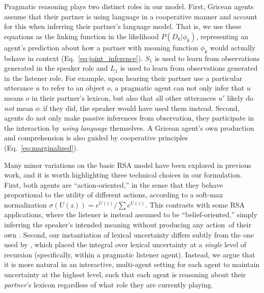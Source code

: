 Pragmatic reasoning plays two distinct roles in our model.
First, Gricean agents assume that their partner is using language in a cooperative manner and account for this when inferring their partner's language model.
That is, we use these equations as the linking function in the likelihood $P(D_k | \phi_k)$, representing an agent's prediction about how a partner with meaning function $\phi_k$ would actually behave in context (Eq.~\ref{eq:joint_inference}). 
$S_1$ is used to learn from observations generated in the speaker role and $L_1$ is used to learn from observations generated in the listener role.
For example, upon hearing their partner use a particular utterance $u$ to refer to an object $o$, a pragmatic agent can not only infer that $u$ means $o$ in their partner's lexicon, but also that all other utterances $u'$ likely do \emph{not} mean $o$: if they did, the speaker would have used them instead.
Second, agents do not only make passive inferences from observation, they participate in the interaction by \emph{using language} themselves.
A Gricean agent's own production and comprehension is also guided by cooperative principles (Eq.~\ref{eq:marginalized}).

Many minor variations on the basic RSA model have been explored in previous work, and it is worth highlighting three technical choices in our formulation.
First, both agents are ``action-oriented,'' in the sense that they behave proportional to the utility of different actions, according to a soft-max normalization $\sigma(U(z)) = e^{U(z)}/\sum e^{U(z)}$.
This contrasts with some RSA applications, where the listener is instead assumed to be ``belief-oriented,'' simply inferring the speaker's intended meaning without producing any action of their own \cite{qing2015variations}.
Second, our instantiation of lexical uncertainty differs subtly from the one used by , which placed the integral over lexical uncertainty at a \emph{single} level of recursion (specifically, within a pragmatic listener agent).
Instead, we argue that it is more natural in an interactive, multi-agent setting for each agent to maintain uncertainty at the highest level, such that each agent is reasoning about their \emph{partner}'s lexicon regardless of what role they are currently playing.

